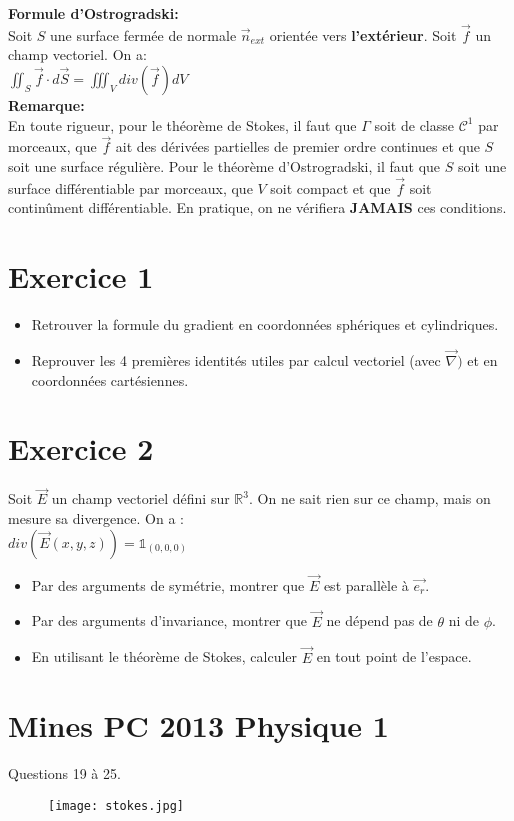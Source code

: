 \documentclass{article}
\begin{document}
\textbf{Formule d'Ostrogradski:} \\[0.2cm]

Soit $S$ une surface fermée de normale $\vec{n}_{ext}$ orientée vers \textbf{l'extérieur}. Soit $\vec{f}$ un champ vectoriel. On a: \\[0.15cm]
$\boxed{ \iint_S \vec{f} \cdot d\vec{S} = \iiint_V div(\vec{f}) dV}$\\[0.3cm]

\textbf{Remarque:} \\[0.2cm]

En toute rigueur, pour le théorème de Stokes, il faut que $\Gamma$ soit de classe $\mathcal{C}^1$ par morceaux, que $\vec{f}$ ait des dérivées partielles de premier ordre continues et que $S$ soit une surface régulière. 
Pour le théorème d'Ostrogradski, il faut que $S$ soit une surface différentiable par morceaux, que $V$ soit compact et que $\vec{f}$ soit continûment différentiable. 
En pratique, on ne vérifiera \textbf{JAMAIS} ces conditions. \\[0.5cm]
\section{Exercice 1}

\begin{itemize}
  \item Retrouver la formule du gradient en coordonnées sphériques et cylindriques.
  \item Reprouver les 4 premières identités utiles par calcul vectoriel (avec $\vec{\nabla})$ et en coordonnées cartésiennes.
\end{itemize}

\section{Exercice 2}

Soit $\vec{E}$ un champ vectoriel défini sur $\mathbb{R}^3$. On ne sait rien sur ce champ, mais on mesure sa divergence. On a : \\

$ div(\vec{E}(x, y, z)) = \mathbb{1}_{(0,0,0)}$ \\
\begin{itemize}
  \item Par des arguments de symétrie, montrer que $\vec{E}$ est parallèle à $\vec{e_r}$.
  \item Par des arguments d'invariance, montrer que $\vec{E}$ ne dépend pas de $\theta$ ni de $\phi$.
  \item En utilisant le théorème de Stokes, calculer $\vec{E}$ en tout point de l'espace.
\end{itemize}



\section{Mines PC 2013 Physique 1}
Questions 19 à 25. 


\begin{figure}[h!]
  \centering
  \texttt{[image: stokes.jpg]}
\end{figure}
\end{document}
